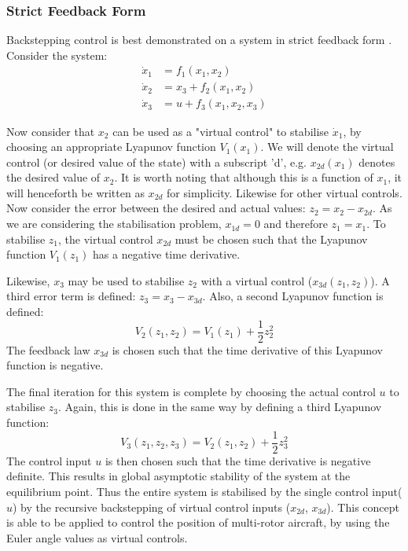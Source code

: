\subsubsection{Strict Feedback Form}
Backstepping control is best demonstrated on a system in strict feedback form \cite{1992a}. Consider the system:
\begin{equation*}
\begin{split}
\dot{x}_{1}&=f_{1}(x_{1},x_{2})\\
\dot{x}_{2}&=x_{3}+f_{2}(x_{1},x_{2})\\
\dot{x}_{3}&=u +f_{3}(x_{1},x_{2}, x_{3})
\end{split}
\end{equation*}

Now consider that $x_{2}$ can be used as a "virtual control" to stabilise $\dot{x}_{1}$, by choosing an appropriate Lyapunov function $V_{1}(x_{1})$. We will denote the virtual control (or desired value of the state) with a subscript 'd', e.g. $x_{2d}(x_{1})$ denotes the desired value of $x_{2}$. It is worth noting that although this is a function of $x_{1}$, it will henceforth be written as $x_{2d}$ for simplicity. Likewise for other virtual controls.  Now consider the error between the desired and actual values: $z_{2}=x_{2}-x_{2d}$. As we are considering the stabilisation problem, $x_{1d}=0$ and therefore $z_{1}=x_{1}$. To stabilise $z_{1}$, the virtual control $x_{2d}$ must be chosen such that the Lyapunov function $V_{1}(z_{1})$ has a negative time derivative.

Likewise, $x_{3}$ may be used to stabilise $z_{2}$ with a virtual control ($x_{3d}(z_{1},z_{2})$). A third error term is defined: $z_{3}=x_{3}-x_{3d}$. Also, a second Lyapunov function is defined: 
\begin{equation*}
V_{2}(z_{1},z_{2})=V_{1}(z_{1})+\frac{1}{2}z_{2}^{2}
\end{equation*}
The feedback law $x_{3d}$ is chosen such that the time derivative of this Lyapunov function is negative. 

The final iteration for this system is complete by choosing the actual control $u$ to stabilise $z_{3}$. Again, this is done in the same way by defining a third Lyapunov function:
\begin{equation*}
V_{3}(z_{1},z_{2},z_{3})=V_{2}(z_{1},z_{2})+\frac{1}{2}z_{3}^{2}
\end{equation*}
The control input $u$ is then chosen such that the time derivative is negative definite. This results in global asymptotic stability of the system at the equilibrium point. Thus the entire system is stabilised by the single control input($u$) by the recursive backstepping of virtual control inputs ($x_{2d}$, $x_{3d}$). This concept is able to be applied to control the position of multi-rotor aircraft, by using the Euler angle values as virtual controls.


